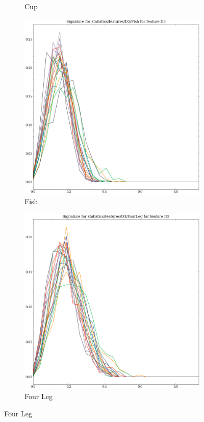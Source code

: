 \begin{figure}[t!p]
\begin{subfigure}[b]{0.23\textwidth}
        \caption{Cup}
    \end{subfigure}
    \hfill
    \begin{subfigure}[b]{0.23\textwidth}
        \includegraphics[width=\textwidth]{assets/feature_extraction/D3/Fish.png}
        \caption{Fish}
    \end{subfigure}
    \hfill
    \begin{subfigure}[b]{0.23\textwidth}
        \includegraphics[width=\textwidth]{assets/feature_extraction/D3/FourLeg.png}
        \caption{Four Leg}
    \end{subfigure}
    \hfill


\end{figure}
